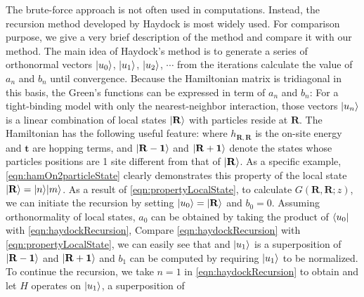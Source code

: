 The brute-force approach is not often used in computations. Instead, the recursion method developed by Haydock 
\cite{haydock1972, haydock1975} is most widely used. For comparison purpose, we give a very brief description of the
method and compare it with our method.  The main idea of Haydock's method is to generate a series of orthonormal
vectors $| u_0 \rangle$, $| u_1 \rangle$, $| u_2 \rangle$, $\cdots$ from the iterations
calculate the value of $a_n$ and $b_n$ until convergence. 
Because the Hamiltonian matrix is tridiagonal in this basis, the Green's functions can be expressed in 
term of $a_n$ and $b_n$:
For a tight-binding model with only the nearest-neighbor 
interaction, those vectors $| u_n \rangle$ is a linear combination of local states $| \mathbf{R} \rangle$ with particles reside at 
$\mathbf{R}$. The Hamiltonian has the following useful feature:
where $h_{\mathbf{R}, \mathbf{R}}$ is the on-site energy and $\mathbf{t}$ are hopping terms, and 
$|  \mathbf{R-1} \rangle$ and $|  \mathbf{R+1} \rangle$ denote the states whose particles 
positions are 1 site  different from that of $|  \mathbf{R} \rangle$. As a specific example, 
\autoref{eqn:hamOn2particleState} clearly demonstrates this property of the local state $|  \mathbf{R} \rangle = 
| n \rangle| m \rangle$. As a result of \autoref{eqn:propertyLocalState}, to calculate $G(\mathbf{R}, \mathbf{R}; z)$, 
we can initiate the recursion by setting $| u_0 \rangle = | \mathbf{R} \rangle$ and $b_0 = 0$. Assuming orthonormality of 
local states, $a_0$ can be obtained by taking the product of $\langle u_0 |$ with \autoref{eqn:haydockRecursion},
Compare \autoref{eqn:haydockRecursion} with \autoref{eqn:propertyLocalState}, we can easily see that 
and $| u_1 \rangle$ is a superposition of $|  \mathbf{R-1} \rangle$ and $|  \mathbf{R+1} \rangle$ and $b_1$ can be 
computed by requiring $| u_1 \rangle$ to be normalized. To continue the recursion, we take
$n=1$ in \autoref{eqn:haydockRecursion} to obtain
and let $H$ operates on $| u_1 \rangle$, a superposition of  
